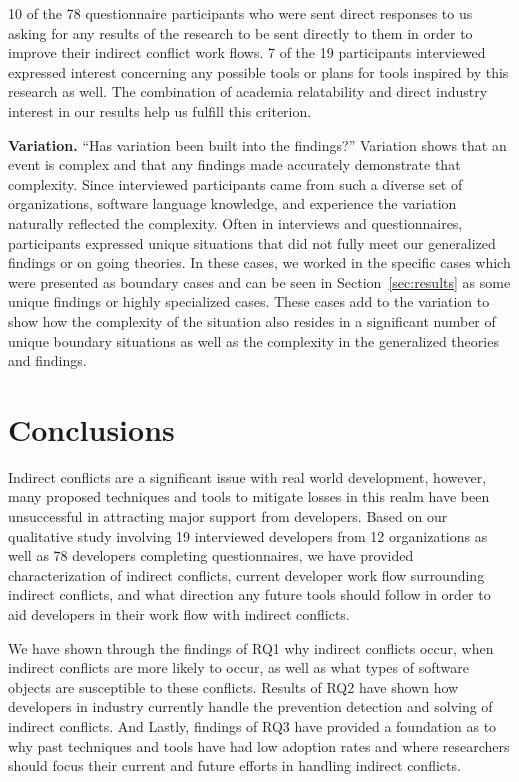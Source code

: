 \documentclass[conference]{IEEEtran}
\begin{document}
10 of the 78 questionnaire participants who were sent direct responses to us asking for any results of the research to be sent directly to
them in order to improve their indirect conflict work flows. 7 of the 19 participants interviewed expressed interest concerning any possible
tools or plans for tools inspired by this research as well. The combination of academia relatability and direct industry interest
in our results help us fulfill this criterion.

{\bfseries Variation.} ``Has variation been built into the findings?'' Variation shows that an event is complex and that any findings
made accurately demonstrate that complexity. Since interviewed participants came from such a diverse set of organizations,
software language knowledge, and experience the variation naturally reflected the complexity. Often in interviews and questionnaires, participants
expressed unique situations that did not fully meet our generalized findings or on going theories. In these cases, we worked in the specific
cases which were presented as boundary cases and can be seen in Section~\ref{sec:results} as some unique findings or highly
specialized cases. These cases add to the variation
to show how the complexity of the situation also resides in a significant number of unique boundary situations as well as the complexity
in the generalized theories and findings.

\section{Conclusions}
\label{sec:conc}

Indirect conflicts are a significant issue with real world development, however, many proposed techniques and tools to mitigate
losses in this realm have been unsuccessful in attracting major support from developers. Based on our qualitative study involving
19 interviewed developers from 12 organizations as well as 78 developers completing questionnaires, we have provided characterization of indirect conflicts,
current developer work flow surrounding indirect conflicts, and what direction any future tools should follow in order to aid developers
in their work flow with indirect conflicts.

We have shown through the findings of RQ1 why indirect conflicts occur, when indirect conflicts are more likely to
occur, as well as what types of software objects are susceptible to these conflicts. Results of RQ2 have shown
how developers in industry currently handle the prevention detection and solving of indirect conflicts. And Lastly, findings of RQ3
have provided a foundation as to why past techniques and tools have had low adoption rates and where
researchers should focus their current and future efforts in handling indirect conflicts.
\end{document}
